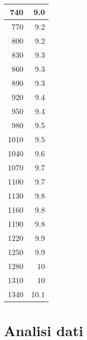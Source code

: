 \documentclass[10pt,twocolumn]{article}
\begin{document}
\begin{table}[H]
\begin{minipage}{.45\textwidth}
\begin{tabular}{|r|r|}
740 & 9.0 \\ \hline
770 & 9.2 \\ \hline
800 & 9.2 \\ \hline
830 & 9.3 \\ \hline
860 & 9.3 \\ \hline
890 & 9.3 \\ \hline
920 & 9.4 \\ \hline
950 & 9.4 \\ \hline
980 & 9.5 \\ \hline
1010 & 9.5 \\ \hline
1040 & 9.6 \\ \hline
1070 & 9.7 \\ \hline
1100 & 9.7 \\ \hline
1130 & 9.8 \\ \hline
1160 & 9.8 \\ \hline
1190 & 9.8 \\ \hline
1220 & 9.9 \\ \hline
1250 & 9.9 \\ \hline
1280 & 10 \\ \hline
1310 & 10 \\ \hline
1340 & 10.1 \\ \hline
\end{tabular}
\end{minipage}
\end{table}
\twocolumn
\section{Analisi dati}
\end{document}
